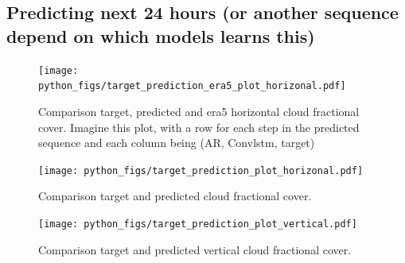 \subsection{Predicting next 24 hours (or another sequence depend on which models learns this)}
\begin{figure}[ht]
    \centering
    \texttt{[image: python\_figs/target\_prediction\_era5\_plot\_horizonal.pdf]}
    \caption{Comparison target, predicted and era5 horizontal cloud fractional cover. Imagine this plot, with a row for each step in the predicted sequence and each column being (AR, Convlstm, target)}
    \label{fig:target_predict_era5_horizontal}
\end{figure}

\begin{figure}[ht]
    \centering
    \texttt{[image: python\_figs/target\_prediction\_plot\_horizonal.pdf]}
    \caption{Comparison target and predicted cloud fractional cover.}
    \label{fig:target_predict_horizontal}
\end{figure}

\begin{figure}[ht]
    \centering
    \texttt{[image: python\_figs/target\_prediction\_plot\_vertical.pdf]}
    \caption{Comparison target and predicted vertical cloud fractional cover.}
    \label{fig:target_predict_vertical}
\end{figure}

